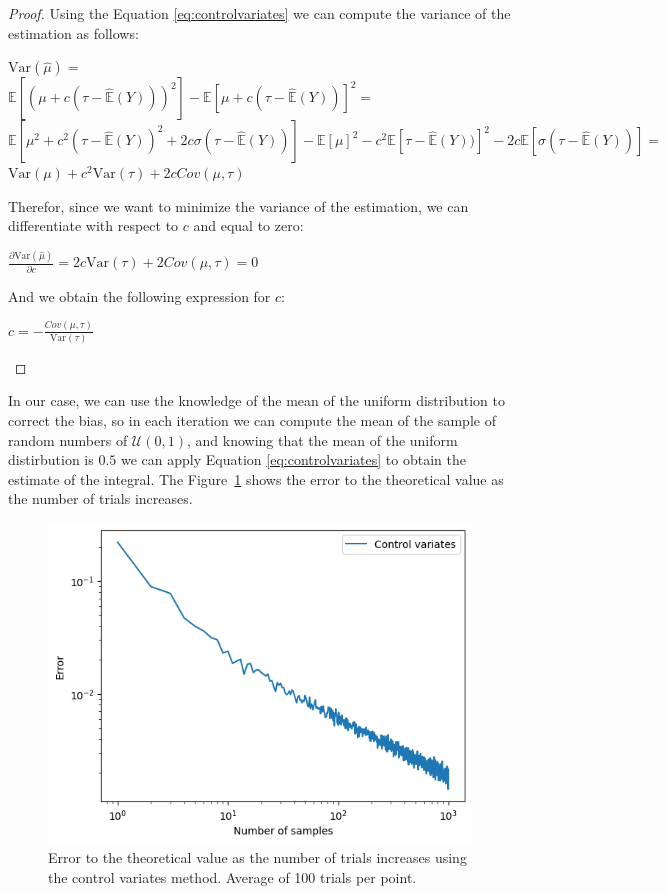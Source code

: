 \documentclass{article}
\begin{document}
\begin{proof}
	Using the Equation \eqref{eq:controlvariates} we can compute the variance of the estimation as follows:
	\begin{center}
		\(\mathrm{Var}(\hat{\mu}) = \) \\

		\(\mathbb{E}[(\mu + c(\tau - \hat{\mathbb{E}}(Y)))^2] - \mathbb{E}[\mu + c(\tau - \hat{\mathbb{E}}(Y))]^2 =\) \\

		\(\mathbb{E}[\mu^2 + c^2(\tau - \hat{\mathbb{E}}(Y))^2 + 2c\sigma(\tau - \hat{\mathbb{E}}(Y))]  - \mathbb{E}[\mu]^2 - c^2\mathbb{E}[\tau - \hat{\mathbb{E}}(Y))]^2 - 2c\mathbb{E}[\sigma(\tau - \hat{\mathbb{E}}(Y))]  =\) \\

		\(\mathrm{Var}(\mu) + c^2 \mathrm{Var}(\tau) + 2cCov(\mu, \tau)\) 
	\end{center}
	Therefor, since we want to minimize the variance of the estimation, we can differentiate with respect to \(c\) and equal to zero:
	\begin{center}
		\(\frac{\partial \mathrm{Var}(\hat{\mu})}{\partial c} = 2c \mathrm{Var}(\tau) + 2Cov(\mu, \tau ) = 0\) \\
	\end{center}
	And we obtain the following expression for \(c\):
	\begin{center}
		\(c = -\frac{Cov(\mu, \tau)}{\mathrm{Var}(\tau)}\) 
	\end{center}


\end{proof}

In our case, we can use the knowledge of the mean of the uniform distribution to correct the bias, so in each iteration we can compute the mean of the sample of random numbers of \(\mathcal{U}(0,1)\), and knowing that the mean of the uniform distirbution is \(0.5\) we can apply Equation \eqref{eq:controlvariates} to obtain the estimate of the integral. The Figure~\ref{fig:controlvariates} shows the error to the theoretical value as the number of trials increases.

\begin{figure}[H]
	\centering
	\includegraphics[width=0.5\linewidth]{./Figures/VarianceReduction/control.png}
	\caption{Error to the theoretical value as the number of trials increases using the control variates method. Average of 100 trials per point.}
	\label{fig:controlvariates}
\end{figure}
\end{document}
